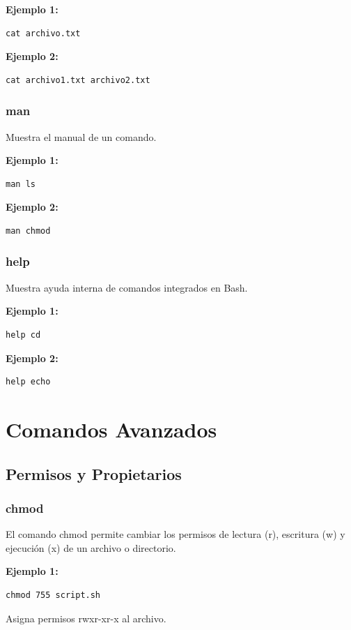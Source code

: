 \documentclass[12pt,a4paper]{article}
\begin{document}
\textbf{Ejemplo 1:}
\begin{lstlisting}
cat archivo.txt
\end{lstlisting}

\textbf{Ejemplo 2:}
\begin{lstlisting}
cat archivo1.txt archivo2.txt
\end{lstlisting}

\subsubsection{man}
Muestra el manual de un comando.

\textbf{Ejemplo 1:}
\begin{lstlisting}
man ls
\end{lstlisting}

\textbf{Ejemplo 2:}
\begin{lstlisting}
man chmod
\end{lstlisting}

\subsubsection{help}
Muestra ayuda interna de comandos integrados en Bash.

\textbf{Ejemplo 1:}
\begin{lstlisting}
help cd
\end{lstlisting}

\textbf{Ejemplo 2:}
\begin{lstlisting}
help echo
\end{lstlisting}

\section{Comandos Avanzados}

\subsection{Permisos y Propietarios}

\subsubsection{chmod}
El comando chmod permite cambiar los permisos de lectura (r), escritura (w) y ejecución (x) de un archivo o directorio.

\textbf{Ejemplo 1:}
\begin{lstlisting}
chmod 755 script.sh
\end{lstlisting}
Asigna permisos rwxr-xr-x al archivo.
\end{document}
